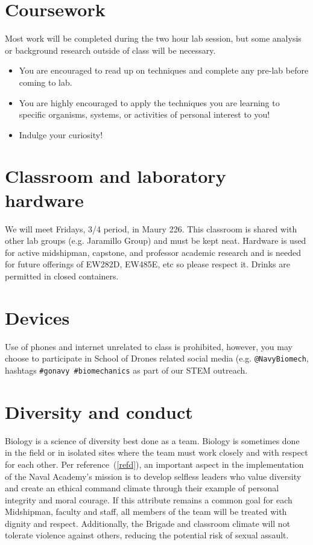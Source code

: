 \documentclass[11pt,courier]{navymemo}
\begin{document}
\section{Coursework}
Most work will be completed during the two hour lab session, but some analysis or background research outside of class will be necessary.
\begin{itemize}
\item You are encouraged to read up on techniques and complete any pre-lab before coming to lab.
\item You are highly encouraged to apply the techniques you are learning to specific organisms, systems, or activities of personal interest to you!
\item Indulge your curiosity!
\end{itemize}

\section{Classroom and laboratory hardware}
We will meet Fridays, 3/4 period, in Maury 226. This classroom is shared with other lab groups (e.g. Jaramillo Group) and must be kept neat. Hardware is used for active midshipman, capstone, and professor academic research and is needed for future offerings of EW282D, EW485E, etc so please respect it. Drinks are permitted in closed containers. 

\section{Devices}
Use of phones and internet unrelated to class is prohibited, however, you may choose to participate in School of Drones related social media (e.g. \texttt{@NavyBiomech}, hashtags \texttt{\#gonavy \#biomechanics} as part of our STEM outreach. 

\section{Diversity and conduct}
Biology is a science of diversity best done as a team. Biology is sometimes done in the field or in isolated sites where the team must work closely and with respect for each other. Per reference~(\ref{refd}), an important aspect in the implementation of the Naval Academy’s mission is to develop selfless leaders who value diversity and create an ethical command climate through their example of personal integrity and moral courage. If this attribute remains a common goal for each Midshipman, faculty and staff, all members of the team will be treated with dignity and respect. Additionally, the Brigade and classroom climate will not tolerate violence against others, reducing the potential risk of sexual assault.
\end{document}
